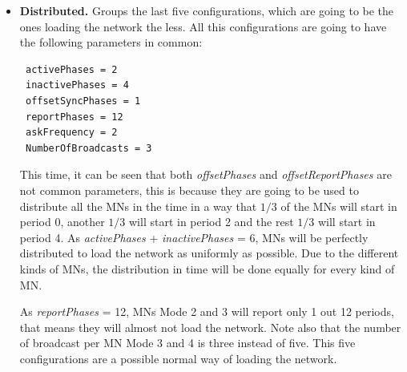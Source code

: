 \begin{itemize}
From this group, and attending to the number of \acp{MN} of each Mode (see Figure \ref{fig:ProtocolPhases}) this 5 configurations are proposed:
\begin{itemize}
 \item[-] \textbf{Config 1}: 15 \acp{MN} Mode 1, 15 \acp{MN} Mode 2, 15 \acp{MN} Mode 3 and 15 \acp{MN} Mode 4.
 \item[-] \textbf{Config 2}: 6 \acp{MN} Mode 1, 6 \acp{MN} Mode 2, 15 \acp{MN} Mode 3 and 33 \acp{MN} Mode 4.
 \item[-] \textbf{Config 3}: 6 \acp{MN} Mode 1, 6 \acp{MN} Mode 2, 33 \acp{MN} Mode 3 and 15 \acp{MN} Mode 4.
 \item[-] \textbf{Config 4}: 33 \acp{MN} Mode 1, 15 \acp{MN} Mode 2, 6 \acp{MN} Mode 3 and 6 \acp{MN} Mode 4.
 \item[-] \textbf{Config 5}: 15 \acp{MN} Mode 1, 33 \acp{MN} Mode 2, 6 \acp{MN} Mode 3 and 6 \acp{MN} Mode 4.
\end{itemize}
 \item \textbf{Distributed. }Groups the last five configurations, which are going to be the ones loading the network the less. All this
configurations are going to have the following parameters in common:
\begin{verbatim}
 activePhases = 2
 inactivePhases = 4
 offsetSyncPhases = 1
 reportPhases = 12
 askFrequency = 2
 NumberOfBroadcasts = 3
\end{verbatim}
This time, it can be seen that both \textit{offsetPhases} and \textit{offsetReportPhases} are not common parameters, this is because they are going to be
used to distribute all the \acp{MN} in the time in a way that $1/3$ of the \acp{MN} will start in period 0, another $1/3$ will start in period 2 and the 
rest $1/3$ will start in period 4. As \textit{activePhases} + \textit{inactivePhases} = 6, \acp{MN} will be perfectly distributed to load the network as 
uniformly as possible. Due to the different kinds of \acp{MN}, the distribution in time will be done equally for every kind of \ac{MN}.

As \textit{reportPhases} = 12, \acp{MN} Mode 2 and 3 will report only 1 out 12 periods, that means they will almost not load the network. Note also that 
the number of broadcast per \ac{MN} Mode 3 and 4 is three instead of five. This five configurations are a possible normal way of loading the network.


\end{itemize}
